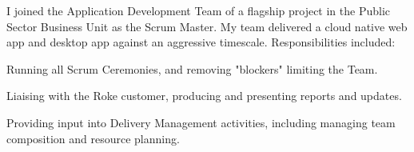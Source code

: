 {}
I joined the Application Development Team of a flagship project in the Public Sector Business Unit as the Scrum Master.
My team delivered a cloud native web app and desktop app against an aggressive timescale.
Responsibilities included:
\vspace{0.25em}
\begin{tightemize}
  \item Running all Scrum Ceremonies, and removing "blockers" limiting the Team.
  \item Liaising with the Roke customer, producing and presenting reports and updates.
  \item Providing input into Delivery Management activities, including managing team composition and resource planning.
\end{tightemize}
\sectionsep
